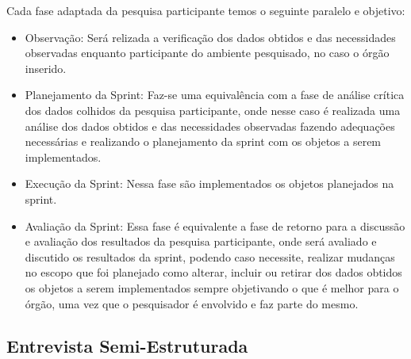 Cada fase adaptada da pesquisa participante temos o seguinte paralelo e objetivo:

\begin{itemize}
	\item Observação: Será relizada a verificação dos dados obtidos e das necessidades observadas enquanto participante do ambiente pesquisado, no caso o órgão inserido.
	\item Planejamento da Sprint: Faz-se uma equivalência com a fase de análise crítica dos dados colhidos da pesquisa participante, onde nesse caso é realizada uma análise dos dados obtidos e das necessidades observadas fazendo adequações necessárias e realizando o planejamento da sprint com os objetos a serem implementados.
	\item Execução da Sprint: Nessa fase são implementados os objetos planejados na sprint.
	\item Avaliação da Sprint: Essa fase é equivalente a fase de retorno para a discussão e avaliação dos resultados da pesquisa participante, onde será avaliado e discutido os resultados da sprint, podendo caso necessite, realizar mudanças no escopo que foi planejado como alterar, incluir ou retirar dos dados obtidos os objetos a serem implementados sempre objetivando o que é melhor para o órgão, uma vez que o pesquisador é envolvido e faz parte do mesmo.
\end{itemize}



\subsection{Entrevista Semi-Estruturada}

